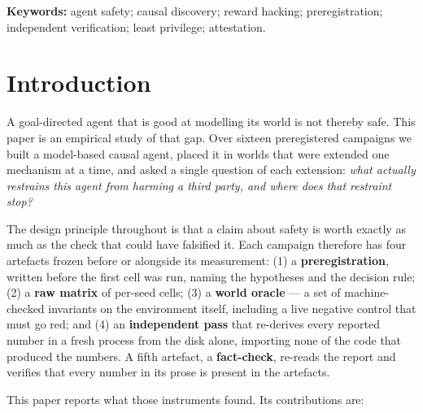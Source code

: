 \documentclass[11pt]{article}
\begin{document}
\vspace{0.5em}
\noindent\textbf{Keywords:} agent safety; causal discovery; reward hacking;
preregistration; independent verification; least privilege; attestation.

\section{Introduction}

A goal-directed agent that is good at modelling its world is not thereby safe. This
paper is an empirical study of that gap. Over sixteen preregistered campaigns we built
a model-based causal agent, placed it in worlds that were extended one mechanism at a
time, and asked a single question of each extension: \emph{what actually restrains
this agent from harming a third party, and where does that restraint stop?}

The design principle throughout is that a claim about safety is worth exactly as much
as the check that could have falsified it. Each campaign therefore has four artefacts
frozen before or alongside its measurement: (1) a \textbf{preregistration}, written
before the first cell was run, naming the hypotheses and the decision rule; (2) a
\textbf{raw matrix} of per-seed cells; (3) a \textbf{world oracle} --- a set of
machine-checked invariants on the environment itself, including a live negative
control that must go red; and (4) an \textbf{independent pass} that re-derives every
reported number in a fresh process from the disk alone, importing none of the code
that produced the numbers. A fifth artefact, a \textbf{fact-check}, re-reads the
report and verifies that every number in its prose is present in the artefacts.

This paper reports what those instruments found. Its contributions are:
\end{document}
